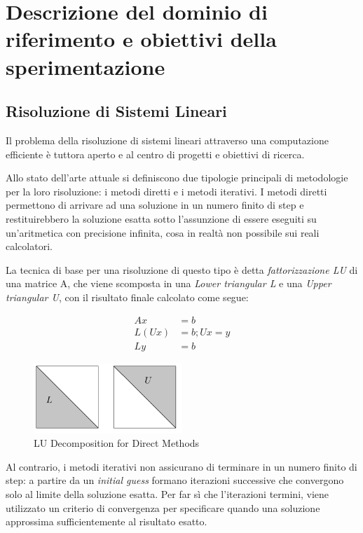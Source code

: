 
\section{Descrizione del dominio di riferimento e obiettivi della sperimentazione} 

\subsection{Risoluzione di Sistemi Lineari}

Il problema della risoluzione di sistemi lineari attraverso una computazione efficiente è tuttora aperto e al centro di progetti e obiettivi di ricerca.

Allo stato dell'arte attuale si definiscono due tipologie principali di metodologie per la loro risoluzione: i metodi diretti e i metodi iterativi.
I metodi diretti permettono di arrivare ad una soluzione in un numero finito di step e restituirebbero la soluzione esatta sotto l'assunzione di essere eseguiti su un'aritmetica con precisione infinita, cosa in realtà non possibile sui reali calcolatori.

La tecnica di base per una risoluzione di questo tipo è detta \textit{fattorizzazione LU} di una matrice A, che viene scomposta in una \textit{Lower triangular L} e una \textit{Upper triangular U}, con il risultato finale calcolato come segue:

\begin{equation} \label{eq1}
\begin{split}
Ax & = b \\
L(Ux) & = b; Ux = y \\
Ly & = b
\end{split}
\end{equation}

\begin{figure}[h!]
    \centering
    \includegraphics[width=0.5\textwidth]{figs/LU_decomposition.png}
    \caption{LU Decomposition for Direct Methods}
    \label{fig:LU_decomposition}
\end{figure}

Al contrario, i metodi iterativi non assicurano di terminare in un numero finito di step: a partire da un \textit{initial guess} formano iterazioni successive che convergono solo al limite della soluzione esatta. 
Per far sì che l'iterazioni termini, viene utilizzato un criterio di convergenza per specificare quando una soluzione approssima sufficientemente al risultato esatto. 

